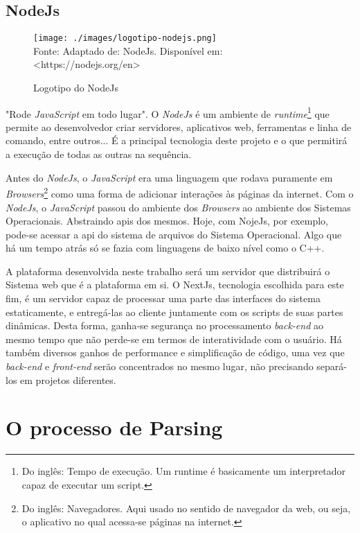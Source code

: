 \subsection{NodeJs}

\begin{figure}[H]
    \centering
    \caption{Logotipo do NodeJs}
    \texttt{[image: ./images/logotipo-nodejs.png]}
    \label{fig:logotipo-nodejs} \\
    \textnormal{\fontsize{10pt}{12pt}Fonte: Adaptado de: NodeJs. Disponível em: <https://nodejs.org/en>}
\end{figure}

"Rode \textit{JavaScript} em todo lugar".
O \textit{NodeJs} é um ambiente de
\textit{runtime}\footnote{Do inglês: Tempo de execução. Um runtime é basicamente um interpretador
    capaz de executar um script.
}
que permite ao desenvolvedor criar servidores, aplicativos
\acrshort{web},
ferramentas e linha de comando, entre outros...
É a principal tecnologia deste projeto e o que permitirá
a execução de todas as outras na sequência.

Antes do \textit{NodeJs}, o \textit{JavaScript} era uma linguagem que
rodava puramente em
\textit{Browsers}\footnote{Do inglês: Navegadores. Aqui usado no sentido de
    navegador da \acrshort{web}, ou seja,
    o aplicativo no qual acessa-se páginas na internet.
}
como uma forma de adicionar interações às páginas da internet.
Com o \textit{NodeJs}, o \textit{JavaScript} passou do ambiente dos \textit{Browsers}
ao ambiente dos Sistemas Operacionais. Abstraindo
\acrshort{api}s
dos mesmos. Hoje, com NojeJs, por exemplo, pode-se
acessar a
\acrshort{api}
do sistema de arquivos do Sistema Operacional.
Algo que há um tempo atrás só se fazia com
linguagens de baixo nível como o C++.

A plataforma desenvolvida neste trabalho será
um servidor que distribuirá o Sistema
\acrshort{web}
que é a plataforma em si. O NextJs,
tecnologia escolhida para este fim,
é um servidor capaz de processar uma parte
das interfaces do sistema estaticamente, e
entregá-las ao cliente juntamente com os scripts
de suas partes dinâmicas. Desta forma,
ganha-se segurança no processamento \textit{back-end}
ao mesmo tempo que não perde-se em termos de
interatividade com o usuário.
Há também diversos ganhos de performance e simplificação
de código, uma vez que \textit{back-end} e \textit{front-end}
serão concentrados no mesmo lugar, não precisando
separá-los em projetos diferentes.

\section{O processo de Parsing}

